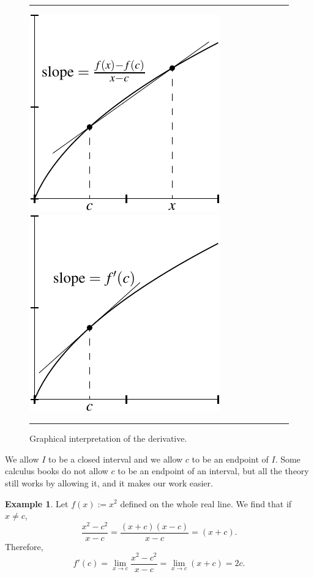 \documentclass[12pt]{book}
\newenvironment{myfigureht}{%
\begin{figure}[h!t]
\noindent\rule{\textwidth}{0.4pt}\vspace{12pt}\par\centering}%
{\par\noindent\rule{\textwidth}{0.4pt}
\end{figure}}
\theoremstyle{plain}
\theoremstyle{remark}
\theoremstyle{definition}
\theoremstyle{exercise}
\theoremstyle{example}
\newtheorem{example}[thm]{Example}
\begin{document}
\begin{myfigureht}
\includegraphics{figures/derivdfig}
\qquad
\includegraphics{figures/derivfig}
\caption{Graphical interpretation of the derivative.\label{derivfig}}
\end{myfigureht}

We allow $I$ to be a closed interval and we allow
$c$ to be an endpoint of $I$.  Some calculus books do not allow $c$ to be an
endpoint of an interval, but all the theory still works by allowing it, and
it makes our work easier.

\begin{example}
Let $f(x) := x^2$ defined on the whole real line.  We find that if
$x \not=c$,
\begin{equation*}
\frac{x^2-c^2}{x-c} =
\frac{(x+c)(x-c)}{x-c} =
(x+c) .
\end{equation*}
Therefore,
\begin{equation*}
f'(c) = 
\lim_{x\to c} \frac{x^2-c^2}{x-c} =
\lim_{x\to c} (x+c) = 2c.
\end{equation*}
\end{example}
\end{document}
